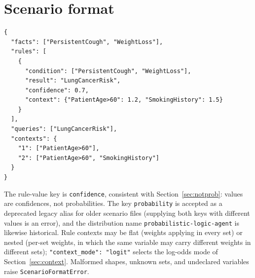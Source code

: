 \section{Scenario format}\label{app:scenario}

\begin{verbatim}
{
  "facts": ["PersistentCough", "WeightLoss"],
  "rules": [
    {
      "condition": ["PersistentCough", "WeightLoss"],
      "result": "LungCancerRisk",
      "confidence": 0.7,
      "context": {"PatientAge>60": 1.2, "SmokingHistory": 1.5}
    }
  ],
  "queries": ["LungCancerRisk"],
  "contexts": {
    "1": ["PatientAge>60"],
    "2": ["PatientAge>60", "SmokingHistory"]
  }
}
\end{verbatim}

The rule-value key is \texttt{confidence}, consistent with
Section~\ref{sec:notprob}: \pla{} values are confidences, not
probabilities. The key \texttt{probability} is accepted as a
deprecated legacy alias for older scenario files (supplying both keys
with different values is an error), and the distribution name
\texttt{probabilistic-logic-agent} is likewise historical.
Rule contexts may be flat (weights applying in every set) or nested
(per-set weights, in which the same variable may carry different weights
in different sets); \texttt{"context\_mode": "logit"} selects the
log-odds mode of Section~\ref{sec:context}. Malformed shapes, unknown
sets, and undeclared variables raise \texttt{ScenarioFormatError}.

